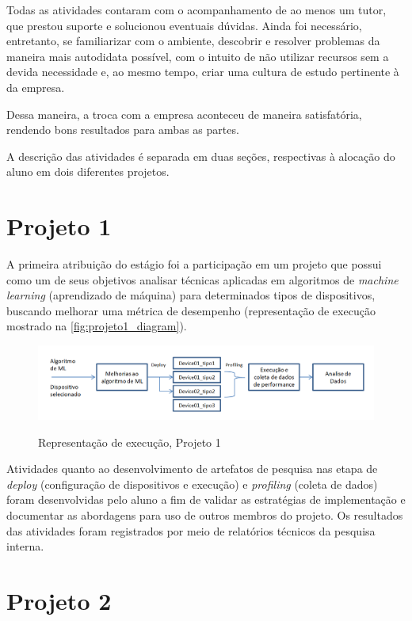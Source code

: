 \documentclass[
	12pt,				%
    oneside,			%
	a4paper,			%
	english,			%
	french,				%
	spanish,			%
	brazil				%
	]{abntex2}
\begin{document}
Todas as atividades contaram com o acompanhamento de ao menos um tutor, que prestou suporte e solucionou eventuais dúvidas. Ainda foi necessário, entretanto, se familiarizar com o ambiente, descobrir e resolver problemas da maneira mais autodidata possível, com o intuito de não utilizar recursos sem a devida necessidade e, ao mesmo tempo, criar uma cultura de estudo pertinente à da empresa. 

Dessa maneira, a troca com a empresa aconteceu de maneira satisfatória, rendendo bons resultados para ambas as partes.

A descrição das atividades é separada em duas seções, respectivas à alocação do aluno em dois diferentes projetos.

\section{Projeto 1}

A primeira atribuição do estágio foi a participação em um projeto que possui como um de seus objetivos analisar técnicas aplicadas em algoritmos de \textit{machine learning} (aprendizado de máquina) para determinados tipos de dispositivos, buscando melhorar uma métrica de desempenho (representação de execução mostrado na \autoref{fig:projeto1_diagram}).

\begin{figure}[H] 
  \centering
  \includegraphics[width=450pt]{images/projeto1_diagram.png}\\
  \caption[Representação de execução, Projeto 1]{Representação de execução, Projeto 1}  \label{fig:projeto1_diagram}
\end{figure}

Atividades quanto ao desenvolvimento de artefatos de pesquisa nas etapa de \textit{deploy} (configuração de dispositivos e execução) e \textit{profiling} (coleta de dados) foram desenvolvidas pelo aluno a fim de validar as estratégias de implementação e documentar as abordagens para uso de outros membros do projeto. Os resultados das atividades foram registrados por meio de relatórios técnicos da pesquisa interna.

\section{Projeto 2}
\end{document}
